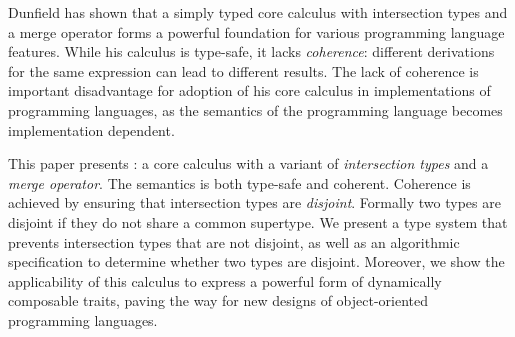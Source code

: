 Dunfield has shown that a simply typed core calculus with
intersection types and a merge operator forms a powerful foundation
for various programming language features. While his calculus
is type-safe, it lacks \emph{coherence}:
different derivations for the same expression can lead to different
results. The lack of coherence is important disadvantage for adoption
of his core calculus in implementations of programming languages, as
the semantics of the programming language becomes implementation
dependent.

This paper presents \name: a core calculus with a variant of
\emph{intersection types} and a
\emph{merge operator}. The semantics \name is both type-safe and
coherent. Coherence is achieved by ensuring that intersection types
are \emph{disjoint}. Formally two types are disjoint if they do not
share a common supertype. We present a type system that prevents
intersection types that are not disjoint, as well as an algorithmic
specification to determine whether two types are disjoint. Moreover,
we show the applicability of this calculus to express a powerful
form of dynamically composable traits, paving the way for new
designs of object-oriented programming languages.~

